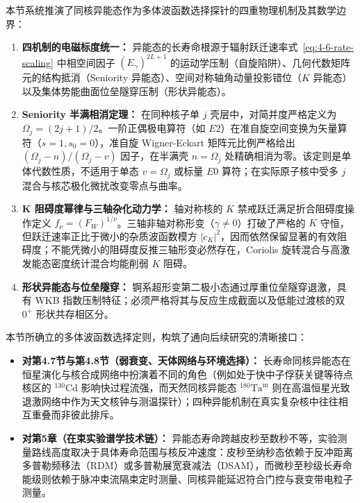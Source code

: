 本节系统推演了同核异能态作为多体波函数选择探针的四重物理机制及其数学边界：
\begin{enumerate}
\item \textbf{四机制的电磁标度统一：} 异能态的长寿命根源于辐射跃迁速率式~\eqref{eq:4-6-rate-scaling} 中相空间因子 $(E_\gamma)^{2L+1}$ 的运动学压制（自旋陷阱）、几何代数矩阵元的结构抵消（Seniority 异能态）、空间对称轴角动量投影错位（$K$ 异能态）以及集体势能曲面位垒隧穿压制（形状异能态）。
\item \textbf{Seniority 半满相消定理：} 在同种核子单 $j$ 壳层中，对简并度严格定义为 $\Omega_j = (2j+1)/2$。一阶正偶极电算符（如 $E2$）在准自旋空间变换为矢量算符（$s=1, s_0=0$），准自旋 Wigner-Eckart 矩阵元比例严格给出 $(\Omega_j - n)/(\Omega_j - v)$ 因子，在半满壳 $n = \Omega_j$ 处精确相消为零。该定则是单体代数性质，不适用于单态 $v=\Omega_j$ 或标量 $E0$ 算符；在实际原子核中受多 $j$ 混合与核芯极化微扰改变零点与曲率。
\item \textbf{K 阻碍度幂律与三轴杂化动力学：} 轴对称核的 $K$ 禁戒跃迁满足折合阻碍度操作定义 $f_\nu = (F_W)^{1/\nu}$。三轴非轴对称形变（$\gamma \ne 0$）打破了严格的 $K$ 守恒，但跃迁速率正比于微小的杂质波函数模方 $|c_K|^2$，因而依然保留显著的有效阻碍度；不能凭微小的阻碍度反推三轴形变必然存在，Coriolis 旋转混合与高激发能态密度统计混合均能削弱 $K$ 阻碍。
\item \textbf{形状异能态与位垒隧穿：} 锕系超形变第二极小态通过厚重位垒隧穿退激，具有 WKB 指数压制特征；必须严格将其与反应生成截面以及低能过渡核的双 $0^+$ 形状共存相区分。
\end{enumerate}

本节所确立的多体波函数选择定则，构筑了通向后续研究的清晰接口：
\begin{itemize}
\item \textbf{对第4.7节与第4.8节（弱衰变、天体网络与环境选择）：} 长寿命同核异能态在恒星演化与核合成网络中扮演着不同的角色（例如处于快中子俘获关键等待点核区的 $^{130}\mathrm{Cd}$ 影响快过程流强，而天然同核异能态 $^{180}\mathrm{Ta}^{\mathrm{m}}$ 则在高温恒星光致退激网络中作为天文核钟与测温探针）；四种异能机制在真实复杂核中往往相互重叠而非彼此排斥。
\item \textbf{对第5章（在束实验谱学技术链）：} 异能态寿命跨越皮秒至数秒不等，实验测量路线高度取决于具体寿命范围与核反冲速度：皮秒至纳秒态依赖于反冲距离多普勒频移法（RDM）或多普勒展宽衰减法（DSAM），而微秒至秒级长寿命能级则依赖于脉冲束流隔束定时测量、同核异能延迟符合门控与衰变带电粒子测量。
\end{itemize}
